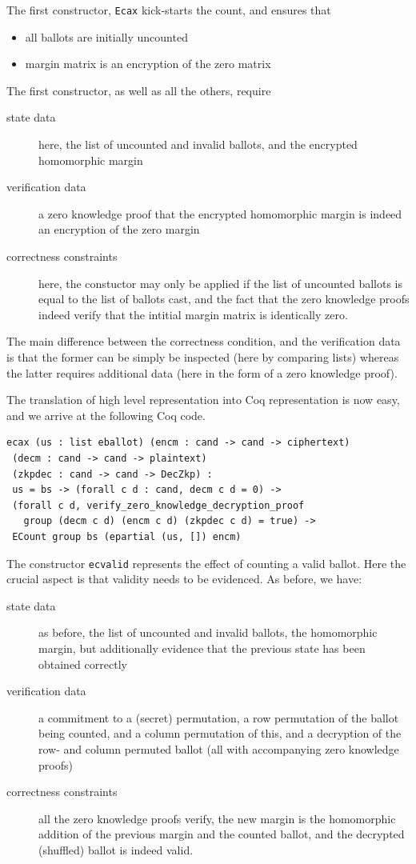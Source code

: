 \documentclass{llncs}
\begin{document}
The first constructor, \texttt{Ecax} kick-starts the count, and
ensures that 
\begin{itemize}
  \item all ballots are initially uncounted
  \item margin matrix is an encryption of the zero matrix
\end{itemize}
The first constructor, as well as all the others, require
\begin{description}
  \item[state data] here, the list of uncounted and invalid ballots,
  and the encrypted homomorphic margin
  \item[verification data] a zero knowledge proof that the encrypted
  homomorphic margin is indeed an encryption of the zero margin
  \item[correctness constraints] here, the constuctor may only be applied if
  the list of uncounted ballots is equal to the list of ballots
  cast, and the fact that the zero knowledge proofs indeed verify
  that the intitial margin matrix is identically zero.
\end{description}

\noindent
The main difference between the correctness condition, and the
verification data is that the former can be simply be inspected
(here by comparing lists) whereas the latter requires additional
data (here  in the form of a zero knowledge proof).

The translation of high level representation into Coq representation
is now easy, and we arrive at the following Coq code.
\begin{lstlisting}[frame=single,basicstyle=\ttfamily\footnotesize]
ecax (us : list eballot) (encm : cand -> cand -> ciphertext)
 (decm : cand -> cand -> plaintext) 
 (zkpdec : cand -> cand -> DecZkp) :
 us = bs -> (forall c d : cand, decm c d = 0) -> 
 (forall c d, verify_zero_knowledge_decryption_proof 
   group (decm c d) (encm c d) (zkpdec c d) = true) -> 
 ECount group bs (epartial (us, []) encm)
\end{lstlisting}


\noindent
The constructor \texttt{ecvalid} represents the effect of counting a
valid ballot. Here the crucial aspect is that validity needs to be
evidenced. As before, we have:
\begin{description}
  \item[state data] as before, the list of uncounted and invalid
  ballots, the homomorphic margin, but additionally evidence that
  the previous state has been obtained correctly
  \item[verification data]
  a commitment to a (secret) permutation, a row permutation of the
  ballot being counted, and a column permutation of this, and a
  decryption of the row- and column permuted ballot (all with
  accompanying zero knowledge proofs)
  \item[correctness constraints] all the zero knowledge proofs
  verify, the new margin is the homomorphic addition of the previous
  margin and the counted ballot, and the decrypted (shuffled)
  ballot is indeed valid.
\end{description}
\end{document}
